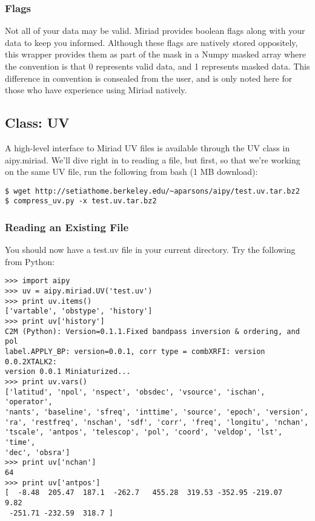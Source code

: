 \subsubsection{Flags}
Not all of your data may be valid.  Miriad provides boolean flags along with 
your data to keep you informed.  Although these flags are natively stored
oppositely, this wrapper provides them as part of the mask in a Numpy masked
array where the convention is that 0 represents valid data, and 1 represents
masked data.  This difference in convention is consealed from the user,
and is only noted here for those who have experience using Miriad natively.

\subsection{Class: UV}

A high-level interface to Miriad UV files is available through the 
UV class in aipy.miriad.  We'll dive right in to reading a file, but first,
so that we're working on the same UV file, run the following from bash (1 MB
download):

\begin{verbatim}
$ wget http://setiathome.berkeley.edu/~aparsons/aipy/test.uv.tar.bz2
$ compress_uv.py -x test.uv.tar.bz2
\end{verbatim}

\subsubsection{Reading an Existing File}

You should now have a test.uv file in your current directory.  Try the
following from Python:

\begin{verbatim}
>>> import aipy
>>> uv = aipy.miriad.UV('test.uv')
>>> print uv.items()
['vartable', 'obstype', 'history']
>>> print uv['history']
C2M (Python): Version=0.1.1.Fixed bandpass inversion & ordering, and pol 
label.APPLY_BP: version=0.0.1, corr type = combXRFI: version 0.0.2XTALK2: 
version 0.0.1 Miniaturized...
>>> print uv.vars()
['latitud', 'npol', 'nspect', 'obsdec', 'vsource', 'ischan', 'operator', 
'nants', 'baseline', 'sfreq', 'inttime', 'source', 'epoch', 'version', 
'ra', 'restfreq', 'nschan', 'sdf', 'corr', 'freq', 'longitu', 'nchan', 
'tscale', 'antpos', 'telescop', 'pol', 'coord', 'veldop', 'lst', 'time', 
'dec', 'obsra']
>>> print uv['nchan']
64
>>> print uv['antpos']
[  -8.48  205.47  187.1  -262.7   455.28  319.53 -352.95 -219.07    9.82
 -251.71 -232.59  318.7 ]
\end{verbatim}

